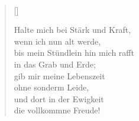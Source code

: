 \begin{verbatim}


\end{verbatim}

\begin{center}
\settowidth{\versewidth}{Der, vor dem die Welt erschrickt,}
\begin{verse}[\versewidth]



 Halte mich bei Stärk und Kraft,\\
wenn ich nun alt werde,\\
bis mein Stündlein hin mich rafft\\
in das Grab und Erde;\\
gib mir meine Lebenszeit\\
ohne sonderm Leide,\\
und dort in der Ewigkeit\\
die vollkommne Freude!

  
\end{verse}
\end{center}


